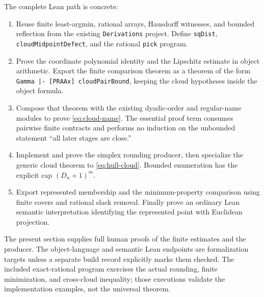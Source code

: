 The complete Lean path is concrete:
\begin{enumerate}
\item Reuse finite least-argmin, rational arrays, Hausdorff witnesses, and
      bounded reflection from the existing \texttt{Derivations} project.
      Define \texttt{sqDist}, \texttt{cloudMidpointDefect}, and the
      rational \texttt{pick} program.
\item Prove the coordinate polynomial identity and the Lipschitz estimate
      in object arithmetic.  Export the finite comparison theorem as
      a theorem of the form \texttt{Gamma |- [PRAAx] cloudPairBound},
      keeping the cloud hypotheses inside the object formula.
\item Compose that theorem with the existing dyadic-order and
      regular-name modules to prove \eqref{eq:cloud-name}.  The essential
      proof term consumes pairwise finite contracts and performs no
      induction on the unbounded statement ``all later stages are close.''
\item Implement and prove the simplex rounding producer, then specialize
      the generic cloud theorem to \eqref{eq:hull-cloud}.  Bounded
      enumeration has the explicit cap \((D_n+1)^m\).
\item Export represented membership and the minimum-property comparison
      using finite covers and rational slack removal.  Finally prove an
      ordinary Lean semantic interpretation identifying the represented
      point with Euclidean projection.
\end{enumerate}
The present section supplies full human proofs of the finite estimates and
the producer.  The object-language and semantic Lean endpoints are
formalization targets unless a separate build record explicitly marks
them checked.  The included exact-rational program exercises the actual
rounding, finite minimization, and cross-cloud inequality; those executions
validate the implementation examples, not the universal theorem.
